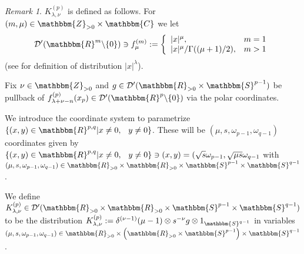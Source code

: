 \documentclass{article}
\newcommand{\assign}{:=}
\theoremstyle{remark}
\newtheorem{remark}[proposition]{Remark}
\newcommand{\D}{\mathcal{D}}
\newcommand{\Sp}{\mathbbm{S}}
\newcommand{\R}{\mathbbm{R}}
\begin{document}
\begin{remark}
  $K^{(p)}_{\lambda, \nu}$ is defined as follows. For $(m, \mu) \in
  \mathbbm{Z}_{> 0} \times \mathbbm{C}$ we let
  \[ \mathcal{D}' (\mathbbm{R}^m \backslash \{ 0 \}) \ni f_{\mu}^{(m)} \assign
     \left\{ \begin{array}{ll}
       | x |^{\mu}, & m = 1\\
       | x |^{\mu} / \Gamma ((\mu + 1) / 2), & m > 1
     \end{array} \right. \]
  (see {\cite[ch. III, sec. 3.2, 3.3]{gelfand1980distribution}} for definition
  of distribution $| x |^{\lambda}$).
  
  Fix $\nu \in \mathbbm{Z}_{> 0}$ and $g \in \D' (\R_{> 0} \times \Sp^{p -
  1})$ be pullback of $f^{(p)}_{\lambda + \nu - n} (x_p) \in \mathcal{D}'
  (\mathbbm{R}^p \backslash \{ 0 \})$ via the polar coordinates.
  
  We introduce the coordinate system to parametrize $\{(x, y) \in \R^{p, q} |x
  \neq 0, \hspace{0.75em} y \neq 0\}$. These will be $(\mu, s, \omega_{p - 1},
  \omega_{q - 1})$ coordinates given by $\{ (x, y) \in \R^{p, q} |x \neq 0,
  \hspace{0.75em} y \neq 0\} \ni (x, y) = (\sqrt{s} \omega_{p - 1}, \sqrt{\mu
  s} \omega_{q - 1}$ with $(\mu, s, \omega_{p - 1}, \omega_{q - 1}) \in \R_{>
  0} \times \R_{> 0} \times \Sp^{p - 1} \times \Sp^{q - 1}$.
  
  We define $K^{(p)}_{\lambda, \nu} \in \D' (\R_{> 0} \times \R_{> 0} \times
  \Sp^{p - 1} \times \Sp^{q - 1})$ to be the distribution $K^{(p)}_{\lambda,
  \nu} \assign \delta^{(\nu - 1)}  (\mu - 1) \otimes s^{- \nu} g \otimes
  1_{\Sp^{q - 1}}$ in variables $(\mu, s, \omega_{p - 1}, \omega_{q - 1}) \in
  \R_{> 0} \times \left( \R_{> 0} \times \Sp^{p - 1} \right) \times \Sp^{q -
  1}$.
\end{remark}
\end{document}

